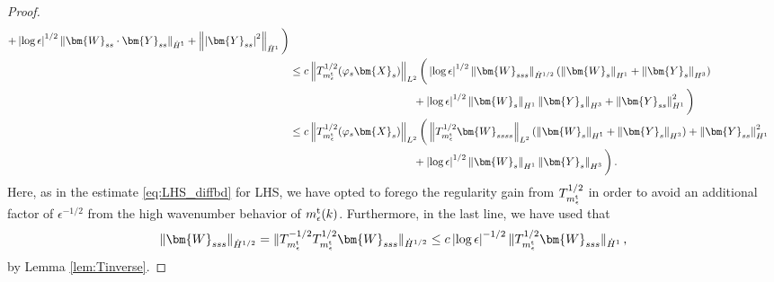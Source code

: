 \documentclass[11pt,reqno]{amsart}
\newcommand{\X}{\bm{X}}
\newcommand{\Y}{\bm{Y}}
\newcommand{\abs}[1]{\left\lvert #1 \right\rvert}
\newcommand{\norm}[1]{\left\lVert #1 \right\rVert}
\numberwithin{equation}{section}
\theoremstyle{definition}
\begin{document}
\begin{proof}
\begin{equation}
\begin{aligned}
  +\abs{\log\epsilon}^{1/2}\norm{\bm{W}_{ss}\cdot\Y_{ss}}_{\dot H^1}+ \norm{\abs{\Y_{ss}}^2}_{\dot H^1}\bigg)\\
  &\le c\norm{T_{m_\epsilon^{\rm t}}^{1/2}(\varphi_s\X_s)}_{L^2}
  \bigg(\abs{\log\epsilon}^{1/2}\norm{\bm{W}_{sss}}_{\dot H^{1/2}}(\norm{\bm{W}_s}_{H^1}+\norm{\Y_s}_{H^3})\\
  &\hspace{4cm}
  +\abs{\log\epsilon}^{1/2}\norm{\bm{W}_s}_{H^1}\norm{\Y_s}_{H^3}
  + \norm{\Y_{ss}}_{H^1}^2\bigg)\\
  &\le c\norm{T_{m_\epsilon^{\rm t}}^{1/2}(\varphi_s\X_s)}_{L^2}
  \bigg(\norm{T_{m_\epsilon^{\rm t}}^{1/2}\bm{W}_{ssss}}_{L^2}(\norm{\bm{W}_s}_{H^1}+\norm{\Y_s}_{H^3}) + \norm{\Y_{ss}}_{H^1}^2\\
  &\hspace{4cm}
  +\abs{\log\epsilon}^{1/2}\norm{\bm{W}_s}_{H^1}\norm{\Y_s}_{H^3}
  \bigg)\,.
\end{aligned}
\end{equation}
Here, as in the estimate \eqref{eq:LHS_diffbd} for LHS, we have opted to forego the regularity gain from $T_{m_\epsilon^{\rm t}}^{1/2}$ in order to avoid an additional factor of $\epsilon^{-1/2}$ from the high wavenumber behavior of $m_\epsilon^{\rm t}(k)$. Furthermore, in the last line, we have used that 
\begin{equation}
\norm{\bm{W}_{sss}}_{\dot H^{1/2}}=\|T_{m_\epsilon^{\rm t}}^{-1/2}T_{m_\epsilon^{\rm t}}^{1/2}\bm{W}_{sss}\|_{\dot H^{1/2}}\le c\abs{\log\epsilon}^{-1/2}\|T_{m_\epsilon^{\rm t}}^{1/2}\bm{W}_{sss}\|_{\dot H^1}\,,
\end{equation}
by Lemma \ref{lem:Tinverse}. 


\end{proof}
\end{document}
